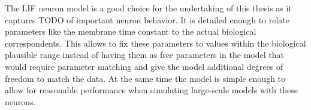 The LIF neuron model is a good choice for the undertaking of this thesis as it captures TODO of important neuron behavior.
It is detailed enough to relate parameters like the membrane time constant to the actual biological correspondents.
This allows to fix these parameters to values within the biological plausible range instead of having them as free parameters in the model that would require parameter matching and give the model additional degrees of freedom to match the data.
At the same time the model is simple enough to allow for reasonable performance when simulating large-scale models with these neurons.
